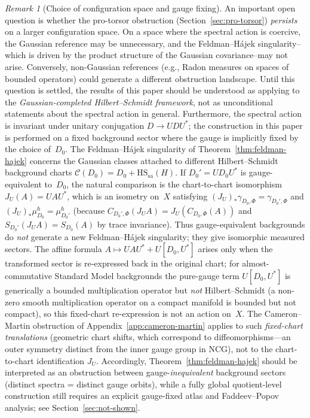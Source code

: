 \documentclass[12pt,a4paper]{article}
\theoremstyle{plain}
\theoremstyle{definition}
\theoremstyle{remark}
\newtheorem{remark}[theorem]{Remark}
\newcommand{\HS}{\mathrm{HS}}
\newcommand{\sa}{\mathrm{sa}}
\begin{document}
\begin{remark}[Choice of configuration space and gauge fixing]
An important open question is whether the pro-torsor obstruction
(Section~\ref{sec:pro-torsor}) \emph{persists} on a larger
configuration space.  On a space where the spectral action is
coercive, the Gaussian reference may be unnecessary, and the
Feldman--H\'ajek singularity--which is driven by the product
structure of the Gaussian covariance--may not arise.  Conversely,
non-Gaussian references (e.g., Radon measures on spaces of bounded
operators) could generate a different obstruction landscape.  Until
this question is settled, the results of this paper should be
understood as applying to the \emph{Gaussian-completed
Hilbert--Schmidt framework}, not as unconditional statements about
the spectral action in general.
Furthermore, the spectral action is invariant under unitary conjugation
$D \to UDU^*$; the construction in this paper is performed on a fixed
background sector where the gauge is implicitly fixed by the choice
of~$D_0$.
The Feldman--H\'ajek singularity of
Theorem~\ref{thm:feldman-hajek} concerns the Gaussian classes
attached to different Hilbert--Schmidt background charts
$\mathcal{C}(D_0) = D_0 + \HS_\sa(H)$.
If $D_0' = UD_0U^*$ is gauge-equivalent to~$D_0$, the natural
comparison is the chart-to-chart isomorphism $J_U(A) = UAU^*$,
which is an isometry on~$X$ satisfying
$(J_U)_*\gamma_{D_0,\Phi} = \gamma_{D_0',\Phi}$ and
$(J_U)_*\mu^\hbar_{D_0} = \mu^\hbar_{D_0'}$
(because $C_{D_0',\Phi}(J_U A) = J_U(C_{D_0,\Phi}(A))$
and $S_{D_0'}(J_U A) = S_{D_0}(A)$ by trace invariance).
Thus gauge-equivalent backgrounds do \emph{not} generate a new
Feldman--H\'ajek singularity; they give isomorphic measured sectors.
The affine formula $A \mapsto UAU^* + U[D_0,U^*]$ arises only
when the transformed sector is re-expressed back in the original
chart; for almost-commutative Standard Model backgrounds the
pure-gauge term $U[D_0,U^*]$ is generically a bounded
multiplication operator but \emph{not} Hilbert--Schmidt (a
non-zero smooth multiplication operator on a compact manifold
is bounded but not compact), so this fixed-chart re-expression is
not an action on~$X$.
The Cameron--Martin obstruction of Appendix~\ref{app:cameron-martin}
applies to such \emph{fixed-chart translations} (geometric chart
shifts, which correspond to diffeomorphisms---an outer symmetry
distinct from the inner gauge group in NCG), not to the
chart-to-chart identification $J_U$.
Accordingly, Theorem~\ref{thm:feldman-hajek} should be interpreted
as an obstruction between gauge-\emph{inequivalent} background
sectors (distinct spectra = distinct gauge orbits), while a fully
global quotient-level construction still requires an explicit
gauge-fixed atlas and Faddeev--Popov analysis; see
Section~\ref{sec:not-shown}.
\end{remark}
\end{document}
